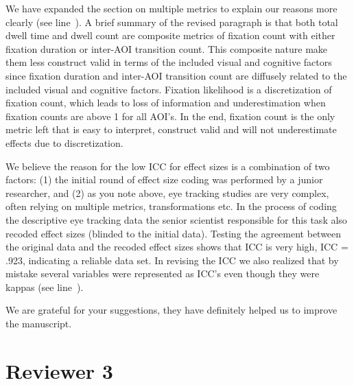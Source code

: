 
We have expanded the section on multiple metrics to explain our reasons more clearly (see line~). A brief summary of the revised paragraph is that both total dwell time and dwell count are composite metrics of fixation count with either fixation duration or inter-AOI transition count. This composite nature make them less construct valid in terms of the included visual and cognitive factors since fixation duration and inter-AOI transition count are diffusely related to the included visual and cognitive factors. Fixation likelihood is a discretization of fixation count, which leads to loss of information and underestimation when fixation counts are above 1 for all AOI's. In the end, fixation count is the only metric left that is easy to interpret, construct valid and will not underestimate effects due to discretization. 



We believe the reason for the low ICC for effect sizes is a combination of two factors: (1) the initial round of effect size coding was performed by a junior researcher, and (2) as you note above, eye tracking studies are very complex, often relying on multiple metrics, transformations etc. In the process of coding the descriptive eye tracking data the senior scientist responsible for this task also recoded effect sizes (blinded to the initial data). Testing the agreement between the original data and the recoded effect sizes shows that ICC is very high, ICC = .923, indicating a reliable data set. In revising the ICC we also realized that by mistake several variables were represented as ICC's even though they were kappas (see line~).



We are grateful for your suggestions, they have definitely helped us to improve the manuscript.




\section{Reviewer 3}
\label{rev:r3}

